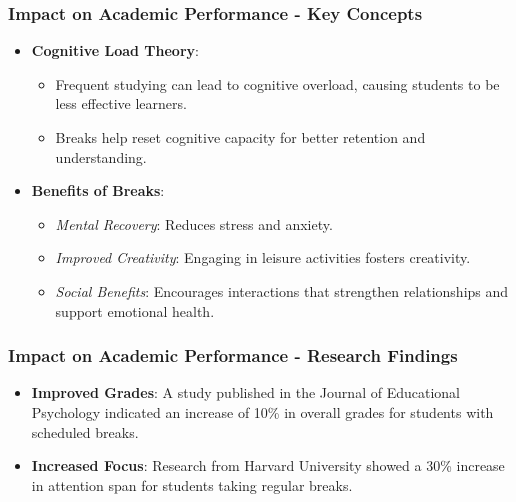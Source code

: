 \documentclass[aspectratio=169]{beamer}
\begin{document}
\begin{frame}[fragile]
    \frametitle{Impact on Academic Performance - Key Concepts}
    \begin{itemize}
        \item \textbf{Cognitive Load Theory}:
            \begin{itemize}
                \item Frequent studying can lead to cognitive overload, causing students to be less effective learners.
                \item Breaks help reset cognitive capacity for better retention and understanding.
            \end{itemize}
        
        \item \textbf{Benefits of Breaks}:
            \begin{itemize}
                \item \textit{Mental Recovery}: Reduces stress and anxiety. 
                \item \textit{Improved Creativity}: Engaging in leisure activities fosters creativity.
                \item \textit{Social Benefits}: Encourages interactions that strengthen relationships and support emotional health.
            \end{itemize}
    \end{itemize}
\end{frame}

\begin{frame}[fragile]
    \frametitle{Impact on Academic Performance - Research Findings}
    \begin{itemize}
        \item \textbf{Improved Grades}: 
            A study published in the Journal of Educational Psychology indicated an increase of 10\% in overall grades for students with scheduled breaks.
        
        \item \textbf{Increased Focus}: 
            Research from Harvard University showed a 30\% increase in attention span for students taking regular breaks.
    \end{itemize}
\end{frame}
\end{document}
